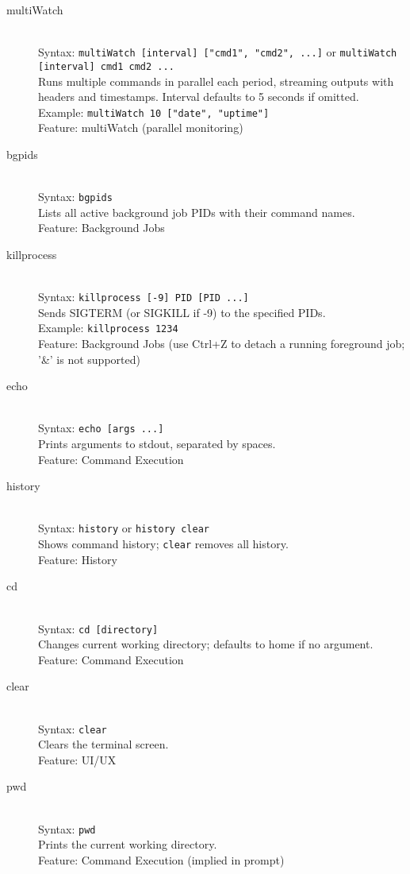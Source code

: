 \documentclass[11pt,a4paper]{article}
\begin{document}
\begin{description}
  \item[multiWatch] \hfill \\
    Syntax: \texttt{multiWatch [interval] ["cmd1", "cmd2", ...]} or \texttt{multiWatch [interval] cmd1 cmd2 ...} \\
    Runs multiple commands in parallel each period, streaming outputs with headers and timestamps. Interval defaults to 5 seconds if omitted. \\
    Example: \texttt{multiWatch 10 ["date", "uptime"]} \\
    Feature: multiWatch (parallel monitoring)

  \item[bgpids] \hfill \\
    Syntax: \texttt{bgpids} \\
    Lists all active background job PIDs with their command names. \\
    Feature: Background Jobs

  \item[killprocess] \hfill \\
    Syntax: \texttt{killprocess [-9] PID [PID ...]} \\
    Sends SIGTERM (or SIGKILL if -9) to the specified PIDs. \\
    Example: \texttt{killprocess 1234} \\
    Feature: Background Jobs (use Ctrl+Z to detach a running foreground job; '&' is not supported)

  \item[echo] \hfill \\
    Syntax: \texttt{echo [args ...]} \\
    Prints arguments to stdout, separated by spaces. \\
    Feature: Command Execution

  \item[history] \hfill \\
    Syntax: \texttt{history} or \texttt{history clear} \\
    Shows command history; \texttt{clear} removes all history. \\
    Feature: History

  \item[cd] \hfill \\
    Syntax: \texttt{cd [directory]} \\
    Changes current working directory; defaults to home if no argument. \\
    Feature: Command Execution

  \item[clear] \hfill \\
    Syntax: \texttt{clear} \\
    Clears the terminal screen. \\
    Feature: UI/UX

  \item[pwd] \hfill \\
    Syntax: \texttt{pwd} \\
    Prints the current working directory. \\
    Feature: Command Execution (implied in prompt)
\end{description}
\end{document}
